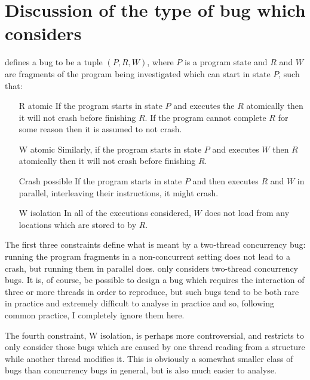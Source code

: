 \section{Discussion of the type of bug which {\technique} considers}
\label{sect:finding_bugs:finding_candidate_bugs:formal_definition}


{\Technique} defines a bug to be a tuple $(P, R, W)$, where $P$ is a
program state and $R$ and $W$ are fragments of the program being
investigated which can start in state $P$, such that:

\begin{itemize}
\item[R atomic] If the program starts in state $P$ and executes the
  $R$ atomically then it will not crash before finishing $R$.  If the
  program cannot complete $R$ for some reason then it is assumed to
  not crash.
\item[W atomic] Similarly, if the program starts in state $P$ and
  executes $W$ then $R$ atomically then it will not crash before
  finishing $R$.
\item[Crash possible] If the program starts in state $P$ and then
  executes $R$ and $W$ in parallel, interleaving their instructions,
  it might crash.
\item[W isolation] In all of the executions considered, $W$ does not
  load from any locations which are stored to by $R$.
\end{itemize}

The first three constraints define what is meant by a two-thread
concurrency bug: running the program fragments in a non-concurrent
setting does not lead to a crash, but running them in parallel does.
{\Technique} only considers two-thread concurrency bugs.  It is, of
course, be possible to design a bug which requires the interaction of
three or more threads in order to reproduce, but such bugs tend to be
both rare in practice and extremely difficult to analyse in
practice\needCite{} and so, following common practice\needCite{}, I
completely ignore them here.

The fourth constraint, W isolation, is perhaps more controversial, and
restricts {\technique} to only consider those bugs which are caused by
one thread reading from a structure while another thread modifies it.
This is obviously a somewhat smaller class of bugs than concurrency
bugs in general, but is also much easier to analyse.  

